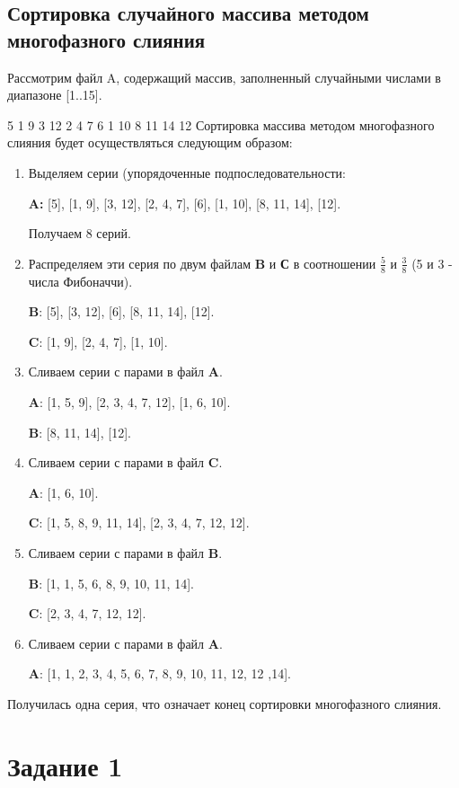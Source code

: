 \documentclass[a4paper, 14pt]{extarticle}
\begin{document}
\subsection{Сортировка случайного массива методом многофазного слияния}
Рассмотрим файл A, содержащий массив, заполненный случайными числами в диапазоне [1..15].

5 1 9 3 12 2 4 7 6 1 10 8 11 14 12
Сортировка массива методом многофазного слияния будет осуществляться
следующим образом:
\begin{enumerate}
  \item Выделяем серии (упорядоченные подпоследовательности:

    \textbf{A:} [5], [1, 9], [3, 12], [2, 4, 7], [6], [1, 10], [8, 11, 14], [12].

    Получаем 8 серий.

  \item Распределяем эти серия по двум файлам \textbf{B} и \textbf{С} в соотношении
    $\frac{5}{8}$ и $\frac{3}{8}$ (5 и 3 - числа Фибоначчи).

    \textbf{B}: [5], [3, 12], [6], [8, 11, 14], [12].

    \textbf{C}: [1, 9], [2, 4, 7], [1, 10].

  \item Сливаем серии с парами в файл \textbf{A}.

    \textbf{A}: [1, 5, 9], [2, 3, 4, 7, 12], [1, 6, 10].

    \textbf{B}: [8, 11, 14], [12].

  \item Сливаем серии с парами в файл \textbf{C}.

    \textbf{A}: [1, 6, 10].

    \textbf{C}: [1, 5, 8, 9, 11, 14], [2, 3, 4, 7, 12, 12].

  \item Сливаем серии с парами в файл \textbf{B}.

    \textbf{B}: [1, 1, 5, 6, 8, 9, 10, 11, 14].

    \textbf{C}: [2, 3, 4, 7, 12, 12].

  \item Сливаем серии с парами в файл \textbf{A}.

    \textbf{A}: [1, 1, 2, 3, 4, 5, 6, 7, 8, 9, 10, 11, 12, 12 ,14].

\end{enumerate}
Получилась одна серия, что означает конец сортировки многофазного слияния.
\section{Задание 1}
\end{document}
